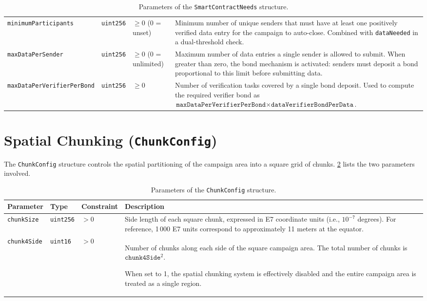 \begin{table}
\begin{tabular}{p{3.8cm} l p{1.8cm} p{8.3cm}}
        \texttt{minimumParticipants}
        & \texttt{uint256}
        & $\geq 0$ (0 = unset)
        & Minimum number of unique senders that must have at least one positively verified data entry for the campaign to auto-close.
        Combined with \texttt{dataNeeded} in a dual-threshold check. \\[6pt]

        \texttt{maxDataPerSender}
        & \texttt{uint256}
        & $\geq 0$ (0 = unlimited)
        & Maximum number of data entries a single sender is allowed to submit.
        When greater than zero, the bond mechanism is activated: senders must deposit a bond proportional to this limit before submitting data. \\[6pt]

        \texttt{maxDataPerVerifier\-PerBond}
        & \texttt{uint256}
        & $\geq 0$
        & Number of verification tasks covered by a single bond deposit.
        Used to compute the required verifier bond as $\texttt{maxDataPerVerifierPerBond} \times \texttt{dataVerifierBondPerData}$. \\
        \hline
    \end{tabular}
    \caption{Parameters of the \texttt{SmartContractNeeds} structure.}
    \label{tab:params-needs}
\end{table}


\section{Spatial Chunking (\texttt{ChunkConfig})}\label{sec:appendix-a-chunks}

The \texttt{ChunkConfig} structure controls the spatial partitioning of the campaign area into a square grid of chunks.
\cref{tab:params-chunks} lists the two parameters involved.

\begin{table}
    \begin{tabular}{p{3.8cm} l p{2.8cm} p{4.8cm}}
        \hline
        \textbf{Parameter} & \textbf{Type} & \textbf{Constraint} & \textbf{Description} \\
        \hline
        \texttt{chunkSize}
        & \texttt{uint256}
        & $> 0$
        & Side length of each square chunk, expressed in E7 coordinate units (i.e., $10^{-7}$ degrees).
        For reference, 1\,000 E7 units correspond to approximately 11 meters at the equator. \\[6pt]

        \texttt{chunk4Side}
        & \texttt{uint16}
        & $> 0$
        & Number of chunks along each side of the square campaign area.
        The total number of chunks is $\texttt{chunk4Side}^2$.

        When set to 1, the spatial chunking system is effectively disabled and the entire campaign area is treated as a single region. \\
        \hline
    \end{tabular}
    \caption{Parameters of the \texttt{ChunkConfig} structure.}
    \label{tab:params-chunks}
\end{table}

